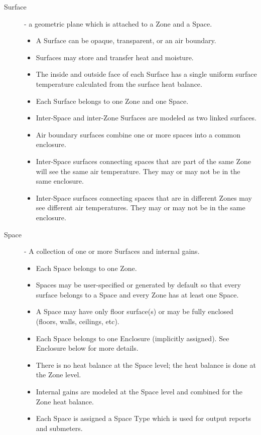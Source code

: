 \begin{description}
  \item[Surface] - a geometric plane which is attached to a Zone and a Space.
  \begin{itemize}
    \item
     A Surface can be opaque, transparent, or an air boundary.
    \item
     Surfaces may store and transfer heat and moisture.
    \item
     The inside and outside face of each Surface has a single uniform surface temperature calculated from the surface heat balance.
    \item
     Each Surface belongs to one Zone and one Space.
    \item
     Inter-Space and inter-Zone Surfaces are modeled as two linked surfaces.
    \item
     Air boundary surfaces combine one or more spaces into a common enclosure.
    \item
     Inter-Space surfaces connecting spaces that are part of the same Zone will see the same air temperature. They may or may not be in the same enclosure.
    \item
     Inter-Space surfaces connecting spaces that are in different Zones may see different air temperatures. They may or may not be in the same enclosure.
  \end{itemize}

  \item[Space] - A collection of one or more Surfaces and internal gains.
  \begin{itemize}
    \item
     Each Space belongs to one Zone.
    \item
     Spaces may be user-specified or generated by default so that every surface belongs to a Space and every Zone has at least one Space.
    \item
     A Space may have only floor surface(s) or may be fully enclosed (floors, walls, ceilings, etc).
    \item
     Each Space belongs to one Enclosure (implicitly assigned). See Enclosure below for more details.
    \item
     There is no heat balance at the Space level; the heat balance is done at the Zone level.
    \item
     Internal gains are modeled at the Space level and combined for the Zone heat balance.
    \item
     Each Space is assigned a Space Type which is used for output reports and submeters.
  \end{itemize}


\end{description}
